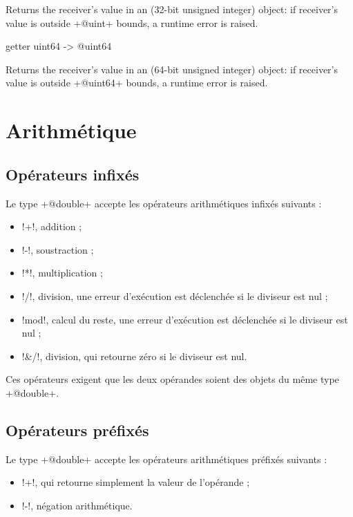 Returns the receiver's value in an  (32-bit unsigned integer) object: if receiver's value is outside \ggst+@uint+ bounds, a runtime error is raised.






\begin{galgas3}
getter uint64 -> @uint64
\end{galgas3}

Returns the receiver's value in an  (64-bit unsigned integer) object: if receiver's value is outside \ggst+@uint64+ bounds, a runtime error is raised.



\section{Arithmétique}

\subsection{Opérateurs infixés}

Le type \ggst+@double+ accepte les opérateurs arithmétiques infixés suivants :
\begin{itemize}
  \item \ggst!+!, addition ;
  \item \ggst!-!, soustraction ;
  \item \ggst!*!, multiplication ;
  \item \ggst!/!, division, une erreur d'exécution est déclenchée si le diviseur est nul ;
  \item \ggst!mod!, calcul du reste, une erreur d'exécution est déclenchée si le diviseur est nul ;
  \item \ggst!&/!, division, qui retourne zéro si le diviseur est nul.
\end{itemize}

Ces opérateurs exigent que les deux opérandes soient des objets du même type \ggst+@double+.

\subsection{Opérateurs préfixés}
Le type \ggst+@double+ accepte les opérateurs arithmétiques préfixés suivants :
\begin{itemize}
  \item \ggst!+!, qui retourne simplement la valeur de l'opérande ;
  \item \ggst!-!, négation arithmétique.
\end{itemize}

